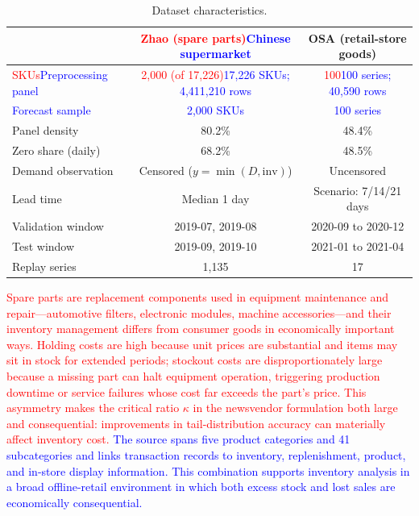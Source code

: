 \documentclass[msom,dblanonrev]{informs4}
\newcommand{\add}[1]{\textcolor{blue}{#1}}
\newcommand{\reduce}[1]{\textcolor{red}{#1}\hspace{0.5em}}
\begin{document}
\begin{table}[ht]
\caption{Dataset characteristics.}\label{tab:data}
\centering\small
\begin{tabular}{lcc}
\toprule
 & \textbf{\reduce{Zhao (spare parts)}\add{Chinese supermarket}} & \textbf{OSA (retail-store goods)} \\
\midrule
\reduce{SKUs}\add{Preprocessing panel} & \reduce{2{,}000 (of 17{,}226)}\add{17{,}226 SKUs; 4{,}411{,}210 rows} & \reduce{100}\add{100 series; 40{,}590 rows} \\
\add{Forecast sample} & \add{2{,}000 SKUs} & \add{100 series} \\
Panel density & 80.2\% & 48.4\% \\
Zero share (daily) & 68.2\% & 48.5\% \\
Demand observation & Censored ($y = \min(D, \text{inv})$) & Uncensored \\
Lead time & Median 1 day & Scenario: 7/14/21 days \\
Validation window & 2019-07, 2019-08 & 2020-09 to 2020-12 \\
Test window & 2019-09, 2019-10 & 2021-01 to 2021-04 \\
Replay series & 1{,}135 & 17 \\
\bottomrule
\end{tabular}
\end{table}

\reduce{Spare parts are replacement components used in equipment maintenance and repair---automotive filters, electronic modules, machine accessories---and their inventory management differs from consumer goods in economically important ways.
Holding costs are high because unit prices are substantial and items may sit in stock for extended periods; stockout costs are disproportionately large because a missing part can halt equipment operation, triggering production downtime or service failures whose cost far exceeds the part's price.
This asymmetry makes the critical ratio $\kappa$ in the newsvendor formulation both large and consequential: improvements in tail-distribution accuracy can materially affect inventory cost.}
\add{The source spans five product categories and 41 subcategories and links transaction records to inventory, replenishment, product, and in-store display information.
This combination supports inventory analysis in a broad offline-retail environment in which both excess stock and lost sales are economically consequential.}
\end{document}
